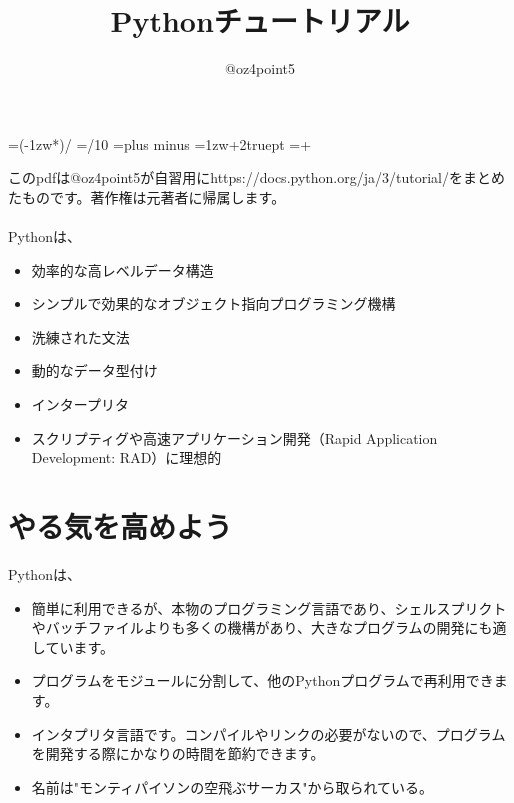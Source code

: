 \documentclass[a4paper,10.5pt]{jarticle}
\begin{document}
%
%
%

\makeatletter
\newcount\@chars\newcount\@lines
{}                      %
\newdimen\@kanjiskip
\@kanjiskip=\dimexpr(\textwidth-1zw*\@chars)/\numexpr{}
\newdimen\@@kanjiskip
\@@kanjiskip=\dimexpr\@kanjiskip/10
\setlength{\@tempdima}{1pt*\ratio{\dimexpr\textheight/\@lines}{\baselineskip}}
\renewcommand{\baselinestretch}{\strip@pt\@tempdima}\selectfont
\kanjiskip=\@kanjiskip plus \@@kanjiskip minus \@@kanjiskip
\parindent=\dimexpr 1zw+2truept
\parindent=\dimexpr\parindent+\@kanjiskip
\makeatother

%
%

\title{Pythonチュートリアル}
\author{@oz4point5}
\date{}
\maketitle

このpdfは@oz4point5が自習用にhttps://docs.python.org/ja/3/tutorial/をまとめたものです。著作権は元著者に帰属します。\\
\\
Pythonは、
\begin{itemize}
\item 効率的な高レベルデータ構造
\item シンプルで効果的なオブジェクト指向プログラミング機構
\item 洗練された文法
\item 動的なデータ型付け
\item インタープリタ
\item スクリプティグや高速アプリケーション開発（Rapid Application Development: RAD）に理想的
\end{itemize}

\tableofcontents

%
%

\newpage
\section{やる気を高めよう}
Pythonは、
\begin{itemize}
\item 簡単に利用できるが、本物のプログラミング言語であり、シェルスプリクトやバッチファイルよりも多くの機構があり、大きなプログラムの開発にも適しています。
\item プログラムをモジュールに分割して、他のPythonプログラムで再利用できます。
\item インタプリタ言語です。コンパイルやリンクの必要がないので、プログラムを開発する際にかなりの時間を節約できます。
\item 名前は"モンティパイソンの空飛ぶサーカス"から取られている。
\end{itemize}
\end{document}
